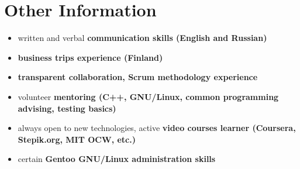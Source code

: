 \section*{Other Information}
\begin{itemize}
    \item written and verbal \bfseries communication skills \mdseries (English and Russian)
    \item \bfseries business trips \mdseries experience (Finland)
    \item \bfseries transparent \mdseries collaboration, \bfseries Scrum \mdseries methodology experience
    \item volunteer \bfseries mentoring \mdseries (C++, GNU/Linux, common programming advising, testing basics)
    \item always open to new technologies, active \bfseries video courses \mdseries learner (Coursera, Stepik.org, MIT OCW, etc.)
    \item certain \bfseries Gentoo \mdseries GNU/Linux administration skills
\end{itemize}

